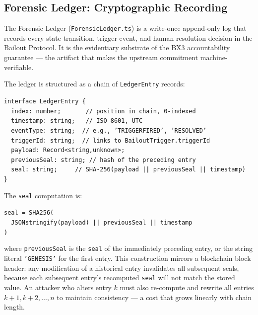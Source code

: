 \subsection{Forensic Ledger: Cryptographic Recording}
\label{sec:forensic-ledger}

The Forensic Ledger (\texttt{ForensicLedger.ts}) is a write-once append-only log that records every state transition, trigger event, and human resolution decision in the Bailout Protocol. It is the evidentiary substrate of the BX3 accountability guarantee --- the artifact that makes the upstream commitment machine-verifiable.

The ledger is structured as a chain of \texttt{LedgerEntry} records:

\medskip
\noindent
\texttt{interface\ LedgerEntry\ \{}\\
\texttt{\ \ index:\ number;\ \ \ \ \ \ \ //\ position\ in\ chain,\ 0-indexed}\\
\texttt{\ \ timestamp:\ string;\ \ \ //\ ISO\ 8601,\ UTC}\\
\texttt{\ \ eventType:\ string;\ \ //\ e.g.,\ 'TRIGGER\textunderscore FIRED',\ 'RESOLVED'}\\
\texttt{\ \ triggerId:\ string;\ \ //\ links\ to\ BailoutTrigger.triggerId}\\
\texttt{\ \ payload:\ Record<string,unknown>;}\\
\texttt{\ \ previousSeal:\ string;\ //\ hash\ of\ the\ preceding\ entry}\\
\texttt{\ \ seal:\ string;\ \ \ \ \ //\ SHA-256(payload\ ||\ previousSeal\ ||\ timestamp)}\\
\texttt{\}}

\medskip
\noindent
The \texttt{seal} computation is:

\medskip
\noindent
\texttt{seal\ =\ SHA256(}\\
\texttt{\ \ JSON\textunderscore stringify(payload)\ ||\ previousSeal\ ||\ timestamp}\\
\texttt{)}

\medskip
\noindent
where \texttt{previousSeal} is the \texttt{seal} of the immediately preceding entry, or the string literal \texttt{'GENESIS'} for the first entry. This construction mirrors a blockchain block header: any modification of a historical entry invalidates all subsequent seals, because each subsequent entry's recomputed \texttt{seal} will not match the stored value. An attacker who alters entry $k$ must also re-compute and rewrite all entries $k + 1, k + 2, \ldots, n$ to maintain consistency --- a cost that grows linearly with chain length.

